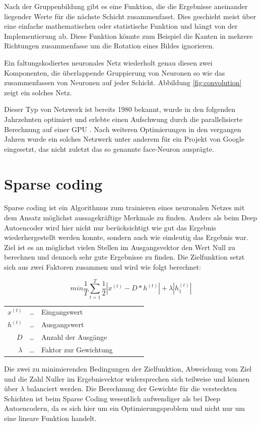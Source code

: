Nach der Gruppenbildung gibt es eine Funktion, die die Ergebnisse aneinander liegender Werte für die nächste Schicht zusammenfasst. Dies geschieht meist über eine einfache mathematischen oder statistische Funktion und hängt von der Implementierung ab. Diese Funktion könnte zum Beispiel die Kanten in mehrere Richtungen zusammenfasse um die Rotation eines Bildes ignorieren.

Ein faltungskodiertes neuronales Netz wiederholt genau diesen zwei Komponenten, die überlappende Gruppierung von Neuronen so wie das zusammenfassen von Neuronen auf jeder Schicht. Abbildung \ref{fig:convolution} zeigt ein solches Netz.

Dieser Typ von Netzwerk ist bereits 1980 \citep{convolutional} bekannt, wurde in den folgenden Jahrzehnten optimiert und erlebte einen Aufschwung durch die parallelisierte Berechnung auf einer GPU \citep{dandan}. Nach weiteren Optimierungen in den vergangen Jahren wurde ein solches Netzwerk unter anderem für ein Projekt von Google \citep{googleimage} eingesetzt, das nicht zuletzt das so genannte face-Neuron ausprägte.

\section{Sparse coding}

Sparse coding ist ein Algorithmus zum trainieren eines neuronalen Netzes mit dem Ansatz möglichst aussagekräftige Merkmale zu finden. Anders als beim Deep Autoencoder wird hier nicht nur berücksichtigt wie gut das Ergebnis wiederhergestellt werden konnte, sondern auch wie eindeutig das Ergebnis war. Ziel ist es an möglichst vielen Stellen im Ausgangsvektor den Wert Null zu berechnen und dennoch sehr gute Ergebnisse zu finden. Die Zielfunktion setzt sich aus zwei Faktoren zusammen und wird wie folgt berechnet:

$$min\frac{1}{T}\sum_{t=1}^{T}\frac{1}{2}|x^{(t)}-D*h^{(t)}|+\lambda|h^{(t)}_1|$$
\begin{center}\begin{tabular}{rclcrcl}
	$x^{(t)}$ & \dots & Eingangswert\\
	$h^{(t)}$ & \dots & Ausgangswert\\
	$D$ & \dots & Anzahl der Ausgänge\\
	$\lambda$ & \dots & Faktor zur Gewichtung\\ 
\end{tabular}\end{center}

Die zwei zu minimierenden Bedingungen der Zielfunktion, Abweichung vom Ziel und die Zahl Nuller im Ergebnisvektor widersprechen sich teilweise und können über $\lambda$ balanciert werden. Die Berechnung der Gewichte für die versteckten Schichten ist beim Sparse Coding wesentlich aufwendiger als bei Deep Autoencodern, da es sich hier um ein Optimierungsproblem und nicht nur um eine lineare Funktion handelt.